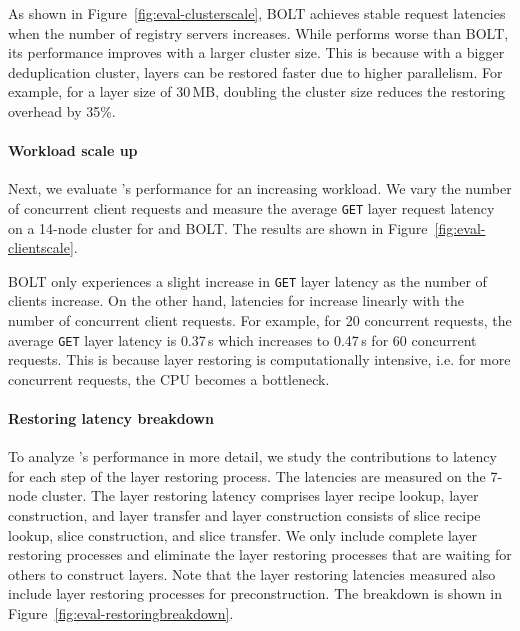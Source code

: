 As shown in Figure~\ref{fig:eval-clusterscale}, BOLT achieves stable request latencies when
the number of registry servers increases.
%
While \sysname performs worse than BOLT, its performance improves with a larger cluster size.
%
This is because with a bigger deduplication cluster, layers can be restored faster due to higher
parallelism.
%
For example, for a layer size of 30\,MB, doubling the cluster size reduces the restoring
overhead by 35\%.

\paragraph{Workload scale up}
%
Next, we evaluate \sysname{}'s performance for an increasing workload.
%
We vary the number of concurrent client requests and measure the average \texttt{GET} layer
request latency on a 14-node cluster for \sysname and BOLT.
%
The results are shown in Figure~\ref{fig:eval-clientscale}.

BOLT only experiences a slight increase in \texttt{GET} layer latency as the number of clients increase.
%
On the other hand, latencies for \sysname increase linearly with the number of concurrent client requests.
%
For example, for 20 concurrent requests, the average \texttt{GET} layer latency is 0.37\,s which
increases to 0.47\,s for 60 concurrent requests.
%
This is because layer restoring is computationally intensive, i.e. for more concurrent requests, the CPU
becomes a bottleneck.

\paragraph{Restoring latency breakdown}
%
To analyze \sysname{}'s performance in more detail, we study the contributions to latency
for each step of the layer restoring process.
%
The latencies are measured on the 7-node cluster.
%
The layer restoring latency comprises layer recipe lookup, layer construction, and layer transfer and
layer construction consists of slice recipe lookup, slice construction, and slice transfer.
%
%
We only include complete layer restoring processes and eliminate the layer restoring processes
that are waiting for others to construct layers.
%
%
Note that the layer restoring latencies measured also include layer restoring processes for preconstruction.
%
The breakdown is shown in Figure~\ref{fig:eval-restoringbreakdown}.

